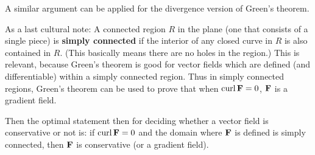 \brm
A similar argument can be applied for the divergence version of Green's theorem.
\erm

As a last cultural note:
\bdf
A connected region $R$ in the plane (one that consists of a single piece) is \textbf{simply connected} if the interior of any closed curve in $R$ is also contained in $R$. (This basically means there are no holes in the region.)
\edf
This is relevant, because Green's theorem is good for vector fields which are defined (and differentiable) within a simply connected region. Thus in simply connected regions, Green's theorem can be used to prove that when $\mathrm{curl}\, \boldsymbol{\mathbf{F}} = 0$, $\boldsymbol{\mathbf{F}}$ is a gradient field.

Then the optimal statement then for deciding whether a vector field is conservative or not is: if $\mathrm{curl}\, \boldsymbol{\mathbf{F}} = 0$ and the domain where $\boldsymbol{\mathbf{F}}$ is defined is simply connected, then $\boldsymbol{\mathbf{F}}$ is conservative (or a gradient field). 

